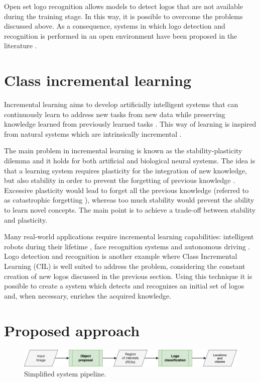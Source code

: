 Open set logo recognition allows models to
detect logos that are not available during the training stage. In this way, it is possible to overcome the problems discussed above. As a consequence, systems in which logo detection and recognition is performed in an open environment have been proposed in the literature \cite{fehervari2019scalable, li2022seetek}.

\section{Class incremental learning}
Incremental learning aims to develop artificially intelligent
systems that can continuously learn to address new tasks
from new data while preserving knowledge learned from
previously learned tasks \cite{masana2020class}. This way of learning is inspired from natural systems which are intrinsically incremental \cite{wu2019large}.

The main problem in incremental learning is known as the stability-plasticity dilemma and it holds for both artificial and biological neural systems. The idea is that a learning system requires plasticity for the integration of new knowledge, but also stability in order to prevent the forgetting of previous knowledge \cite{mermillod2013stability}. Excessive plasticity would lead to forget all the previous knowledge (referred to as catastrophic forgetting \cite{grossberg2013adaptive}), whereas too much stability would prevent the ability to learn novel concepts. The main point is to achieve a trade-off between stability and plasticity. 

Many real-world applications require incremental learning capabilities: intelligent robots during their lifetime \cite{thrun1995lifelong}, face recognition systems \cite{li2017incremental} and autonomous driving \cite{pierre2018incremental}. Logo detection and recognition is another example where Class Incremental Learning (CIL) is well suited to address the problem, considering the constant creation of new logos discussed in the previous section. Using this technique it is possible to create a system which detects and recognizes an initial set of logos and, when necessary, enriches the acquired knowledge.

\section{Proposed approach}

\begin{figure}
    \begin{center}
        \includegraphics[width=\columnwidth]{images/pipeline.drawio.png}
    \end{center}
    \caption{Simplified system pipeline.}
    \label{fig:system-pipeline}
\end{figure}


